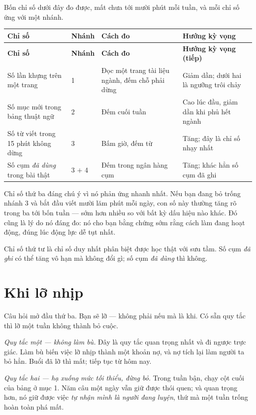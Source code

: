 \documentclass[../../english.tex]{subfiles}
\begin{document}
Bốn chỉ số dưới đây đo được, mất chưa tới mười phút mỗi tuần, và mỗi chỉ số ứng với một nhánh.

\begin{center}\footnotesize
{}
\begin{longtable}{@{}L{4.4cm}L{1.3cm}L{4.4cm}L{4.1cm}@{}}
\toprule
\textbf{Chỉ số} & \textbf{Nhánh} & \textbf{Cách đo} & \textbf{Hướng kỳ vọng}\\
\midrule
\endfirsthead
\toprule
\textbf{Chỉ số} & \textbf{Nhánh} & \textbf{Cách đo} & \textbf{Hướng kỳ vọng (tiếp)}\\
\midrule
\endhead
Số lần khựng trên một trang & 1 & Đọc một trang tài liệu ngành, đếm chỗ phải dừng & Giảm dần; dưới hai là ngưỡng trôi chảy\\
Số mục mới trong bảng thuật ngữ & 2 & Đếm cuối tuần & Cao lúc đầu, giảm dần khi phủ hết ngành\\
Số từ viết trong 15 phút không dừng & 3 & Bấm giờ, đếm từ & Tăng; đây là chỉ số nhạy nhất\\
Số cụm \emph{đã dùng} trong bài thật & 3 \(+\) 4 & Đếm trong ngân hàng cụm & Tăng; khác hẳn số cụm đã ghi\\
\bottomrule
\end{longtable}
\end{center}

Chỉ số thứ ba đáng chú ý vì nó phản ứng nhanh nhất. Nếu bạn đang bỏ trống nhánh 3 và bắt đầu viết mười lăm phút mỗi ngày, con số này thường tăng rõ trong ba tới bốn tuần --- sớm hơn nhiều so với bất kỳ dấu hiệu nào khác. Đó cũng là lý do nó đáng đo: nó cho bạn bằng chứng sớm rằng cách làm đang hoạt động, đúng lúc động lực dễ tụt nhất.

Chỉ số thứ tư là chỉ số duy nhất phân biệt được học thật với sưu tầm. Số cụm \emph{đã ghi} có thể tăng vô hạn mà không đổi gì; số cụm \emph{đã dùng} thì không.

\section{Khi lỡ nhịp}

Câu hỏi mở đầu thứ ba. Bạn sẽ lỡ --- không phải nếu mà là khi. Có sẵn quy tắc thì lỡ một tuần không thành bỏ cuộc.

\emph{Quy tắc một --- không làm bù.} Đây là quy tắc quan trọng nhất và đi ngược trực giác. Làm bù biến việc lỡ nhịp thành một khoản nợ, và nợ tích lại làm người ta bỏ hẳn. Buổi đã lỡ thì mất; tiếp tục từ hôm nay.

\emph{Quy tắc hai --- hạ xuống mức tối thiểu, đừng bỏ.} Trong tuần bận, chạy cột cuối của bảng ở mục 1. Năm câu một ngày vẫn giữ được thói quen; và quan trọng hơn, nó giữ được việc \emph{tự nhận mình là người đang luyện}, thứ mà một tuần trống hoàn toàn phá mất.
\end{document}
